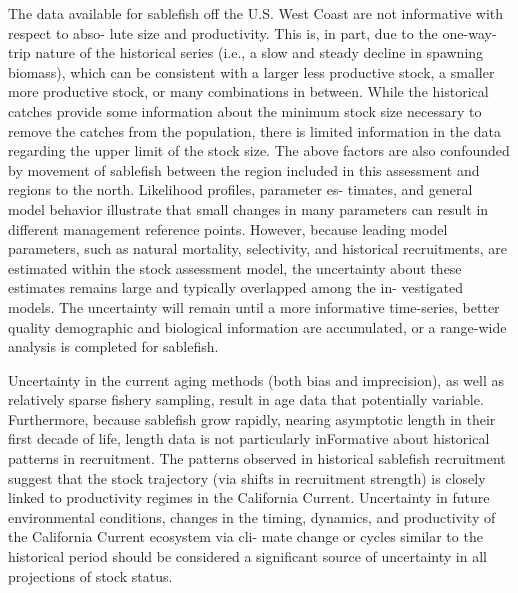\documentclass[11pt,
  english,
  a4paper,
]{article}
\begin{document}
\leavevmode\tagmcend\tagstructend


The data available for sablefish off the U.S. West Coast are not informative with respect to abso- lute size and productivity. This is, in part, due to the one-way-trip nature of the historical series (i.e., a slow and steady decline in spawning biomass), which can be consistent with a larger less productive stock, a smaller more productive stock, or many combinations in between. While the historical catches provide some information about the minimum stock size necessary to remove the catches from the population, there is limited information in the data regarding the upper limit of the stock size. The above factors are also confounded by movement of sablefish between the region included in this assessment and regions to the north. Likelihood profiles, parameter es- timates, and general model behavior illustrate that small changes in many parameters can result in different management reference points. However, because leading model parameters, such as natural mortality, selectivity, and historical recruitments, are estimated within the stock assessment model, the uncertainty about these estimates remains large and typically overlapped among the in- vestigated models. The uncertainty will remain until a more informative time-series, better quality demographic and biological information are accumulated, or a range-wide analysis is completed for sablefish.

\leavevmode\tagmcend\tagstructend\par


Uncertainty in the current aging methods (both bias and imprecision), as well as relatively sparse fishery sampling, result in age data that potentially variable. Furthermore, because sablefish grow rapidly, nearing asymptotic length in their first decade of life, length data is not particularly inFormative about historical patterns in recruitment. The patterns observed in historical sablefish recruitment suggest that the stock trajectory (via shifts in recruitment strength) is closely linked to productivity regimes in the California Current. Uncertainty in future environmental conditions, changes in the timing, dynamics, and productivity of the California Current ecosystem via cli- mate change or cycles similar to the historical period should be considered a significant source of uncertainty in all projections of stock status.
\end{document}
